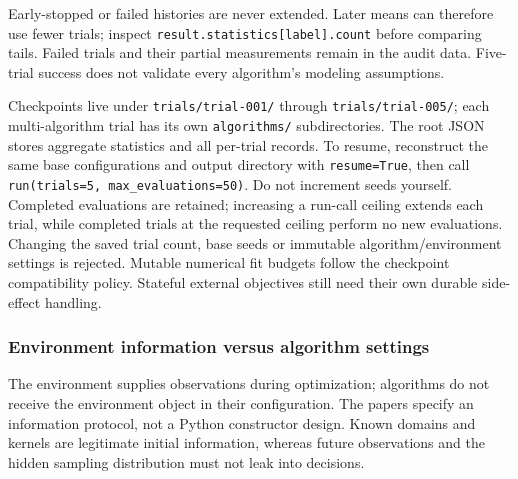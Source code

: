 \documentclass[10pt,a4paper]{article}
\begin{document}
Early-stopped or failed histories are never extended. Later means can therefore use fewer trials; inspect \texttt{result.\allowbreak{}statistics[label].\allowbreak{}count} before comparing tails. Failed trials and their partial measurements remain in the audit data. Five-trial success does not validate every algorithm's modeling assumptions.


Checkpoints live under \texttt{trials/\allowbreak{}trial-001/\allowbreak{}} through \texttt{trials/\allowbreak{}trial-005/\allowbreak{}}; each multi-algorithm trial has its own \texttt{algorithms/\allowbreak{}} subdirectories. The root JSON stores aggregate statistics and all per-trial records. To resume,\allowbreak{} reconstruct the same base configurations and output directory with \texttt{resume=\allowbreak{}True},\allowbreak{} then call \texttt{run(trials=\allowbreak{}5,\allowbreak{} max\_\allowbreak{}evaluations=\allowbreak{}50)}. Do not increment seeds yourself. Completed evaluations are retained; increasing a run-call ceiling extends each trial,\allowbreak{} while completed trials at the requested ceiling perform no new evaluations. Changing the saved trial count,\allowbreak{} base seeds or immutable algorithm/environment settings is rejected. Mutable numerical fit budgets follow the checkpoint compatibility policy. Stateful external objectives still need their own durable side-effect handling.


\subsubsection*{Environment information versus algorithm settings}

The environment supplies observations during optimization; algorithms do not receive the environment object in their configuration. The papers specify an information protocol,\allowbreak{} not a Python constructor design. Known domains and kernels are legitimate initial information,\allowbreak{} whereas future observations and the hidden sampling distribution must not leak into decisions.
\end{document}

